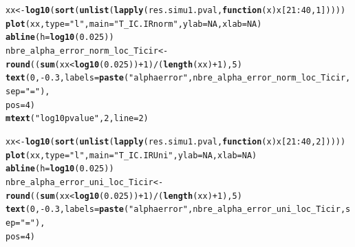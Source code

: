 \documentclass[12pt]{article}\usepackage[]{graphicx}\usepackage[]{color}
\makeatletter
\newcommand{\hlnum}[1]{\textcolor[rgb]{0.686,0.059,0.569}{#1}}%
\newcommand{\hlstr}[1]{\textcolor[rgb]{0.192,0.494,0.8}{#1}}%
\newcommand{\hlopt}[1]{\textcolor[rgb]{0,0,0}{#1}}%
\newcommand{\hlstd}[1]{\textcolor[rgb]{0.345,0.345,0.345}{#1}}%
\newcommand{\hlkwa}[1]{\textcolor[rgb]{0.161,0.373,0.58}{\textbf{#1}}}%
\newcommand{\hlkwb}[1]{\textcolor[rgb]{0.69,0.353,0.396}{#1}}%
\newcommand{\hlkwc}[1]{\textcolor[rgb]{0.333,0.667,0.333}{#1}}%
\newcommand{\hlkwd}[1]{\textcolor[rgb]{0.737,0.353,0.396}{\textbf{#1}}}%
\newenvironment{kframe}{%
 \def\at@end@of@kframe{}%
 \ifinner\ifhmode%
  \def\at@end@of@kframe{\end{minipage}}%
  \begin{minipage}{\columnwidth}%
 \fi\fi%
 \def\FrameCommand##1{\hskip\@totalleftmargin \hskip-\fboxsep
 \colorbox{shadecolor}{##1}\hskip-\fboxsep
     \hskip-\linewidth \hskip-\@totalleftmargin \hskip\columnwidth}%
 \MakeFramed {\advance\hsize-\width
   \@totalleftmargin\z@ \linewidth\hsize
   \@setminipage}}%
 {\par\unskip\endMakeFramed%
 \at@end@of@kframe}
\newenvironment{knitrout}{}{} %
\makeatother
\begin{document}
\begin{landscape}
\begin{knitrout}
\begin{kframe}
\begin{alltt}
\hlstd{xx} \hlkwb{<-} \hlkwd{log10}\hlstd{(}\hlkwd{sort}\hlstd{(}\hlkwd{unlist}\hlstd{(}\hlkwd{lapply}\hlstd{(res.simu1.pval,} \hlkwa{function}\hlstd{(}\hlkwc{x}\hlstd{) x[}\hlnum{21}\hlopt{:}\hlnum{40}\hlstd{,} \hlnum{1}\hlstd{]))))}
\hlkwd{plot}\hlstd{(xx,} \hlkwc{type} \hlstd{=} \hlstr{"l"}\hlstd{,} \hlkwc{main} \hlstd{=} \hlstr{"T_IC.IR norm"}\hlstd{,} \hlkwc{ylab} \hlstd{=} \hlnum{NA}\hlstd{,} \hlkwc{xlab} \hlstd{=} \hlnum{NA}\hlstd{)}
\hlkwd{abline}\hlstd{(}\hlkwc{h} \hlstd{=} \hlkwd{log10}\hlstd{(}\hlnum{0.025}\hlstd{))}
\hlstd{nbre_alpha_error_norm_loc_Ticir} \hlkwb{<-} \hlkwd{round}\hlstd{((}\hlkwd{sum}\hlstd{(xx} \hlopt{<} \hlkwd{log10}\hlstd{(}\hlnum{0.025}\hlstd{))} \hlopt{+}\hlnum{1} \hlstd{)} \hlopt{/} \hlstd{(}\hlkwd{length}\hlstd{(xx)}\hlopt{+}\hlnum{1}\hlstd{),} \hlnum{5}\hlstd{)}
\hlkwd{text}\hlstd{(}\hlnum{0}\hlstd{,} \hlopt{-}\hlnum{0.3}\hlstd{,} \hlkwc{labels} \hlstd{=} \hlkwd{paste}\hlstd{(}\hlstr{"alpha error"}\hlstd{, nbre_alpha_error_norm_loc_Ticir,} \hlkwc{sep} \hlstd{=} \hlstr{" = "}\hlstd{),}
     \hlkwc{pos} \hlstd{=} \hlnum{4}\hlstd{)}
\hlkwd{mtext}\hlstd{(}\hlstr{"log10 pvalue"}\hlstd{,} \hlnum{2}\hlstd{,} \hlkwc{line} \hlstd{=} \hlnum{2}\hlstd{)}

\hlstd{xx} \hlkwb{<-} \hlkwd{log10}\hlstd{(}\hlkwd{sort}\hlstd{(}\hlkwd{unlist}\hlstd{(}\hlkwd{lapply}\hlstd{(res.simu1.pval,} \hlkwa{function}\hlstd{(}\hlkwc{x}\hlstd{) x[}\hlnum{21}\hlopt{:}\hlnum{40}\hlstd{,} \hlnum{2}\hlstd{]))))}
\hlkwd{plot}\hlstd{(xx,} \hlkwc{type} \hlstd{=} \hlstr{"l"}\hlstd{,} \hlkwc{main} \hlstd{=} \hlstr{"T_IC.IR Uni"}\hlstd{,} \hlkwc{ylab} \hlstd{=} \hlnum{NA}\hlstd{,} \hlkwc{xlab} \hlstd{=} \hlnum{NA}\hlstd{)}
\hlkwd{abline}\hlstd{(}\hlkwc{h} \hlstd{=} \hlkwd{log10}\hlstd{(}\hlnum{0.025}\hlstd{))}
\hlstd{nbre_alpha_error_uni_loc_Ticir} \hlkwb{<-} \hlkwd{round}\hlstd{((}\hlkwd{sum}\hlstd{(xx} \hlopt{<} \hlkwd{log10}\hlstd{(}\hlnum{0.025}\hlstd{))} \hlopt{+}\hlnum{1} \hlstd{)} \hlopt{/} \hlstd{(}\hlkwd{length}\hlstd{(xx)}\hlopt{+}\hlnum{1}\hlstd{),} \hlnum{5}\hlstd{)}
\hlkwd{text}\hlstd{(}\hlnum{0}\hlstd{,} \hlopt{-}\hlnum{0.3}\hlstd{,} \hlkwc{labels} \hlstd{=} \hlkwd{paste}\hlstd{(}\hlstr{"alpha error"}\hlstd{, nbre_alpha_error_uni_loc_Ticir,} \hlkwc{sep} \hlstd{=} \hlstr{" = "}\hlstd{),}
     \hlkwc{pos} \hlstd{=} \hlnum{4}\hlstd{)}


\end{alltt}
\end{kframe}
\end{knitrout}
\end{landscape}
\end{document}
